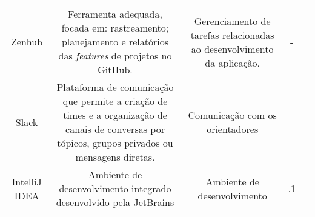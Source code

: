 \begin{table}[]
	\begin{tabular}{|c|c|c|c|c}
	\cline{1-4}
	\cellcolor[HTML]{EFEFEF}\begin{minipage} [t] {0.3\textwidth} \centering  Zenhub \cite{zenhub2020} \end{minipage} & \cellcolor[HTML]{EFEFEF}\begin{minipage} [t] {0.3\textwidth} \centering   Ferramenta adequada, focada em: rastreamento; planejamento e relatórios das \emph{features} de projetos no GitHub.   \end{minipage}             & \cellcolor[HTML]{EFEFEF}\begin{minipage} [t] {0.2\textwidth} \centering  Gerenciamento de tarefas relacionadas ao desenvolvimento da aplicação.  \end{minipage}  & \begin{minipage} [t] {0.1\textwidth} \centering  - \end{minipage} &  \\ \cline{1-4}
	\begin{minipage} [t] {0.3\textwidth} \centering  Slack \cite{slack2013} \end{minipage}                   & \begin{minipage} [t] {0.3\textwidth} \centering Plataforma de comunicação que permite a criação de times e a organização de canais de conversas por tópicos, grupos privados ou mensagens diretas.  \end{minipage}                & \begin{minipage} [t] {0.2\textwidth} \centering  Comunicação com os orientadores \end{minipage}        & \begin{minipage} [t] {0.1\textwidth} \centering  - \end{minipage} &  \\ \cline{1-4}
	\begin{minipage} [t] {0.3\textwidth} \centering  IntelliJ IDEA \cite{intelij} \end{minipage}                     & \begin{minipage} [t] {0.3\textwidth} \centering  Ambiente de desenvolvimento integrado desenvolvido pela JetBrains \end{minipage} 	& \begin{minipage} [t] {0.2\textwidth} \centering Ambiente de desenvolvimento \end{minipage}	 & \begin{minipage} [t] {0.1\textwidth} \centering  2021.3.1 \end{minipage}  &  \\ \cline{1-4}

\end{tabular}
\end{table}
